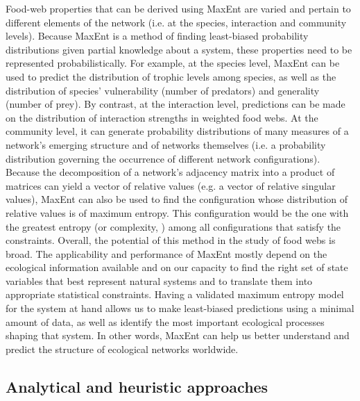 Food-web properties that can be derived using MaxEnt are varied and pertain to
different elements of the network (i.e. at the species, interaction and
community levels). Because MaxEnt is a method of finding least-biased
probability distributions given partial knowledge about a system, these
properties need to be represented probabilistically. For example, at the species
level, MaxEnt can be used to predict the distribution of trophic levels among
species, as well as the distribution of species' vulnerability (number of
predators) and generality (number of prey). By contrast, at the interaction
level, predictions can be made on the distribution of interaction strengths in
weighted food webs. At the community level, it can generate probability
distributions of many measures of a network's emerging structure and of networks
themselves (i.e. a probability distribution governing the occurrence of
different network configurations). Because the decomposition of a network's
adjacency matrix into a product of matrices can yield a vector of relative
values (e.g. a vector of relative singular values), MaxEnt can also be used to
find the configuration whose distribution of relative values is of maximum
entropy. This configuration would be the one with the greatest entropy (or
complexity, \cite{Strydom2021Roadmapa}) among all configurations that satisfy the
constraints. Overall, the potential of this method in the study of food webs is
broad. The applicability and performance of MaxEnt mostly depend on the
ecological information available and on our capacity to find the right set of
state variables that best represent natural systems and to translate them into
appropriate statistical constraints. Having a validated maximum entropy model
for the system at hand allows us to make least-biased predictions using a
minimal amount of data, as well as identify the most important ecological
processes shaping that system. In other words, MaxEnt can help us better
understand and predict the structure of ecological networks worldwide. 

\subsection{Analytical and heuristic approaches}

